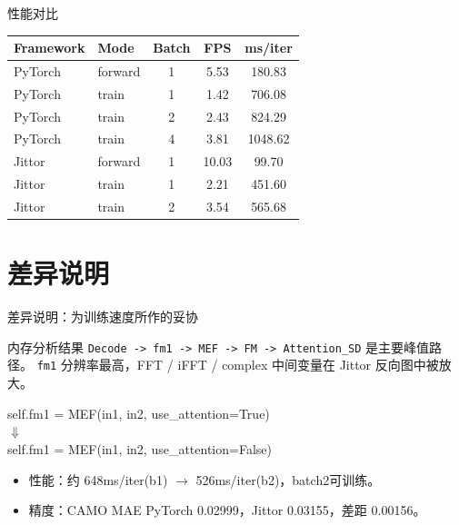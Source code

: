 \begin{frame}{性能对比}
  \small
  \renewcommand{\arraystretch}{1.2}
  \begin{tabular}{p{} p{} c c c}
    \toprule
    Framework & Mode & Batch & FPS & ms/iter \\
    \midrule
    PyTorch & forward & 1 & 5.53 & 180.83 \\
    PyTorch & train & 1 & 1.42 & 706.08 \\
    PyTorch & train & 2 & 2.43 & 824.29 \\
    PyTorch & train & 4 & 3.81 & 1048.62 \\
    Jittor & forward & 1 & 10.03 & 99.70 \\
    Jittor & train & 1 & 2.21 & 451.60 \\
    Jittor & train & 2 & 3.54 & 565.68 \\
    \bottomrule
  \end{tabular}

\end{frame}

\section{差异说明}

\begin{frame}{差异说明：为训练速度所作的妥协}
  \begin{block}{内存分析结果}
    \texttt{Decode -> fm1 -> MEF -> FM -> Attention\_SD} 是主要峰值路径。
    \texttt{fm1} 分辨率最高，FFT / iFFT / complex 中间变量在 Jittor 反向图中被放大。
  \end{block}

  \vspace{0.4em}
  \begin{center}
    \ttfamily\scriptsize
    self.fm1 = MEF(in1, in2, use\_attention=True) \\
    \(\Downarrow\) \\
    self.fm1 = MEF(in1, in2, use\_attention=False)
  \end{center}
  \vspace{0.2em}
  \begin{itemize}
    \item 性能：约 648ms/iter(b1) \(\rightarrow\) 526ms/iter(b2)，batch2可训练。
    \item 精度：CAMO MAE PyTorch 0.02999，Jittor 0.03155，差距 0.00156。
  \end{itemize}
\end{frame}


